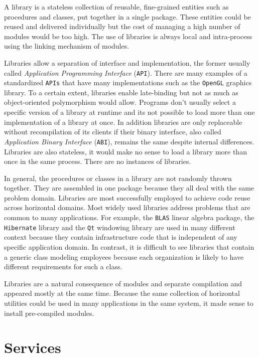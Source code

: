 A library is a stateless collection of reusable, fine-grained entities such as procedures and classes, put together in a single package. These entities could be reused
and delivered individually but the cost of managing a high number of modules would be too high. The use of libraries is always local and intra-process using the linking
mechanism of modules.

Libraries allow a separation of interface and implementation, the former usually called \emph{Application Programming Interface} (\texttt{API}). There are many examples
of a standardized \texttt{APIs} that have many implementations such as the \texttt{OpenGL} graphics library. To a certain extent, libraries enable late-binding but not
as much as object-oriented polymorphism would allow. Programs don't usually select a specific version of a library at runtime and its not possible to load more than
one implementation of a library at once. In addition libraries are only replaceable without recompilation of its clients if their binary interface, also called
\emph{Application Binary Interface} (\texttt{ABI}), remains the same despite internal differences. Libraries are also stateless, it would make no sense to load a library
more than once in the same process. There are no instances of libraries.

In general, the procedures or classes in a library are not randomly thrown together. They are assembled in one package because they all deal with the same problem domain.
Libraries are most successfully employed to achieve code reuse across horizontal domains. Most widely used libraries address problems that are common to many applications.
For example, the \texttt{BLAS} linear algebra package, the \texttt{Hibernate} library and the \texttt{Qt} windowing library are used in many different context because they
contain infrastructure code that is independent of any specific application domain. In contrast, it is difficult to see libraries that contain a generic class modeling employees
because each organization is likely to have different requirements for such a class.

Libraries are a natural consequence of modules and separate compilation and appeared mostly at the same time. Because the same collection of horizontal utilities
could be used in many applications in the same system, it made sense to install pre-compiled modules.

\section{Services}
\label{sec:services}

